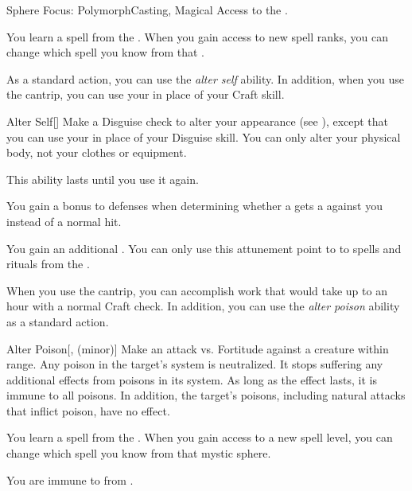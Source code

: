     \begin{feat}{Sphere Focus: Polymorph}{Casting, Magical}
        \featpre Access to the  .

         You learn a spell from the  .
        When you gain access to new spell ranks, you can change which spell you know from that .

         As a standard action, you can use the \textit{alter self} ability.
        In addition, when you use the  cantrip, you can use your  in place of your Craft skill.
        \begin{freeability}{Alter Self}[]
            Make a Disguise check to alter your appearance (see ), except that you can use your  in place of your Disguise skill.
            You can only alter your physical body, not your clothes or equipment.

            This ability lasts until you use it again.
        \end{freeability}

         You gain a  bonus to defenses when determining whether a  gets a  against you instead of a normal hit.

         You gain an additional .
        You can only use this attunement point to  to spells and rituals from the  .

         When you use the  cantrip, you can accomplish work that would take up to an hour with a normal Craft check.
        In addition, you can use the \textit{alter poison} ability as a standard action.
        \begin{freeability}{Alter Poison}[,  (minor)]
            Make an attack vs. Fortitude against a creature within \rngshort range.
            \hit Any poison in the target's system is neutralized.
            It stops suffering any additional effects from poisons in its system.
            As long as the effect lasts, it is immune to all poisons.
            In addition, the target's  poisons, including natural attacks that inflict poison, have no effect.
        \end{freeability}

         You learn a spell from the  .
        When you gain access to a new spell level, you can change which spell you know from that mystic sphere.

         You are immune to  from .
    \end{feat}

